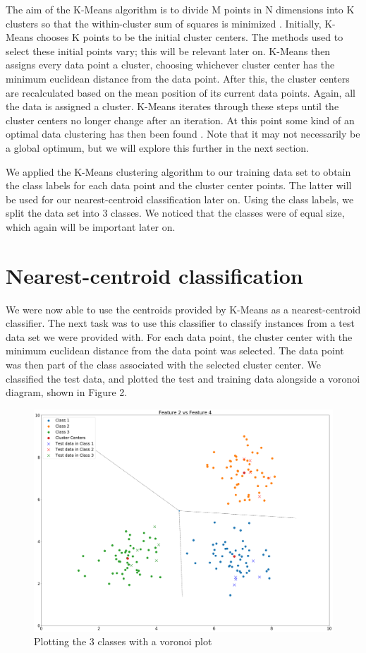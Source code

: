 \documentclass[a4paper]{article}
\begin{document}
The aim of the K-Means algorithm is to divide M points in N dimensions into K clusters so that the within-cluster sum of squares is minimized \cite{kmeans}. Initially, K-Means chooses K points to be the initial cluster centers. The methods used to select these initial points vary; this will be relevant later on. K-Means then assigns every data point a cluster,  choosing whichever cluster center has the minimum euclidean distance from the data point. After this, the cluster centers are recalculated based on the mean position of its current data points. Again, all the data is assigned a cluster. K-Means iterates through these steps until the cluster centers no longer change after an iteration. At this point some kind of an optimal data clustering has then been found \cite{clarion}. Note that it may not necessarily be a global optimum, but we will explore this further in the next section.

We applied the K-Means clustering algorithm to our training data set to obtain the class labels for each data point and the cluster center points. The latter will be used for our nearest-centroid classification later on. Using the class labels, we split the data set into 3 classes. We noticed that the classes were of equal size, which again will be important later on.

\section{Nearest-centroid classification}

We were now able to use the centroids provided by K-Means as a nearest-centroid classifier. The next task was to use this classifier to classify instances from a test data set we were provided with. For each data point, the cluster center with the minimum euclidean distance from the data point was selected. The data point was then part of the class associated with the selected cluster center.  We classified the test data, and plotted the test and training data alongside a voronoi diagram, shown in Figure 2.


\begin{figure}[h!]
\centering
\includegraphics[width=1\columnwidth]{plot2.png}
\caption{Plotting the 3 classes with a voronoi plot}
\end{figure}
\end{document}
